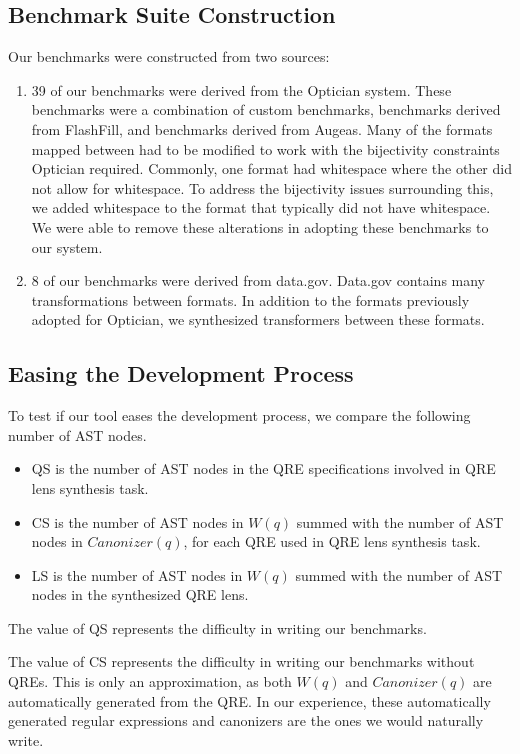 \documentclass{svproc}
\newcommand{\canonizer}{\ensuremath{\mathit{Canonizer}}}
\newcommand{\QRESize}{QS}
\newcommand{\CanonizerAndSpecSize}{CS}
\newcommand{\LensAndSpecSize}{LS}
\begin{document}
\subsection{Benchmark Suite Construction} 
Our benchmarks were constructed from two sources:
\begin{enumerate}
\item 39 of our benchmarks were derived from the Optician system.  These
  benchmarks were a combination of custom benchmarks, benchmarks derived from
  FlashFill, and benchmarks derived from Augeas.  Many of the formats mapped
  between had to be modified to work with the bijectivity constraints
  Optician required.  Commonly, one format had whitespace where the other did
  not allow for whitespace.  To address the bijectivity issues surrounding this,
  we added whitespace to the format that typically did not have whitespace.  We
  were able to remove these alterations in adopting these benchmarks to our
  system.

\item 8 of our benchmarks were derived from data.gov.  Data.gov contains
  many transformations between formats.  In addition to the formats previously
  adopted for Optician, we synthesized transformers between these formats.
\end{enumerate}

\subsection{Easing the Development Process}

To test if our tool eases the development process, we compare the following
number of AST nodes.
%
\begin{itemize}
\item[\QRESize{}] \QRESize{} is the number of AST nodes in the QRE
  specifications involved in QRE lens synthesis task.
\item[\CanonizerAndSpecSize{}] \CanonizerAndSpecSize{} is the number of
  AST nodes in $W(q)$ summed with the number of AST nodes in $\canonizer(q)$,
  for each QRE used in QRE lens synthesis task.
\item[\LensAndSpecSize{}] \LensAndSpecSize{} is the number of AST nodes
  in $W(q)$ summed with the number of AST nodes in the synthesized QRE lens.
\end{itemize}

The value of \QRESize{} represents the difficulty in writing our benchmarks.

The value of \CanonizerAndSpecSize{} represents the difficulty in writing our
benchmarks without QREs.  This is only an approximation, as both $W(q)$ and
$\canonizer(q)$ are automatically generated from the QRE.  In our
experience, these automatically generated regular expressions and canonizers are
the ones we would naturally write.
\end{document}
